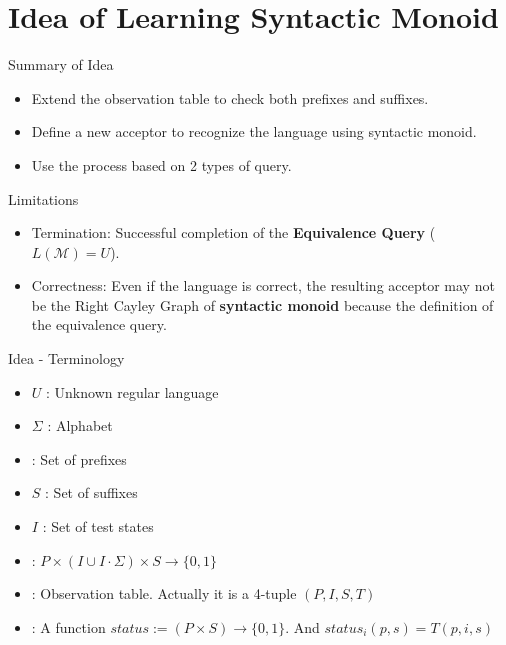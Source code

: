 \documentclass{beamer}
\begin{document}
\section{Idea of Learning Syntactic Monoid}


\begin{frame}{Summary of Idea}
    \begin{itemize}
        \item Extend the observation table to check both prefixes and suffixes.
        \item Define a new acceptor to recognize the language using syntactic monoid.
        \item Use the process based on 2 types of query.
    \end{itemize}    

    \begin{alertblock}{Limitations}
        \begin{itemize}
            \item Termination: Successful completion of the \textbf{Equivalence Query} ($L(\mathcal{M}) = U$).
            \item Correctness: Even if the language is correct, the resulting acceptor may not be the Right
Cayley Graph of \textbf{syntactic monoid} because the definition of the equivalence query.
        \end{itemize}
    \end{alertblock}
\end{frame}

\begin{frame}{Idea - Terminology}
    \begin{itemize}
        \item $U$ : Unknown regular language
        \item $\Sigma$ : Alphabet
        \item \textbf{\color{red}{$P$}} : Set of prefixes
        \item $S$ : Set of suffixes
        \item $I$ : Set of test states
        \item \textbf{\color{red}{$T$}}: $P\times (I \cup I \cdot \Sigma) \times S \to \{0,1\}$
        \item \textbf{\color{red}{$OT$}} : {\small Observation table. Actually it is a 4-tuple} $(P,I,S,T)$
        \item \textbf{\color{red}{$status$}}: A function $status:= (P \times S) \rightarrow\{0,1\}$. And $status_i (p,s) = T(p,i,s)$
    \end{itemize}    
\end{frame}
\end{document}
